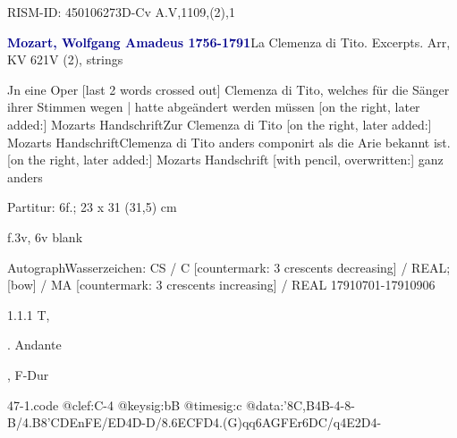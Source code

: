 \documentclass[a4paper, twocolumn, 11pt]{book}
\begin{document}
\par RISM-ID: 450106273\newline D-Cv  A.V,1109,(2),1
\par \vspace{16pt} \textcolor{darkblue}{\textbf{Mozart, Wolfgang Amadeus  1756-1791}}\hfillplus{[47]}\newline La Clemenza di Tito. Excerpts. Arr, KV 621\newline V (2), strings
\par \begin{itshape} Jn eine Oper [last 2 words crossed out] Clemenza di Tito, welches für die Sänger ihrer Stimmen wegen | hatte abgeändert werden müssen [on the right, later added:] Mozarts Handschrift Zur Clemenza di Tito [on the right, later added:] Mozarts Handschrift Clemenza di Tito anders componirt als die Arie bekannt ist.  [on the right, later added:] Mozarts Handschrift [with pencil, overwritten:] ganz anders\end{itshape} 
\par \textcolor{darkblue}{}  Partitur: 6f.; 23 x 31 (31,5) cm\newline \begin{small} f.3v, 6v blank\end{small} \newline Autograph\newline Wasserzeichen: CS / C [countermark: 3 crescents decreasing] / REAL; [bow] / MA [countermark: 3 crescents increasing] / REAL  17910701-17910906
\par 1.1.1  T, \begin{itshape}[No 1 Duetto]. Andante\end{itshape}, F-Dur\newline \begin{footnotesize}  \end{footnotesize}  
\begin{filecontents*}{47-1.code}
@clef:C-4
@keysig:bB
@timesig:c
@data:'{8C,B}4B-4-8-B/4.B8'C{DE}{nFE}/{ED}4D-D/8.6{EC}{FD}4.(G)qq{6AGFE}r{6DC}/q4E2D4-
\end{filecontents*}
\newline %
\end{document}
